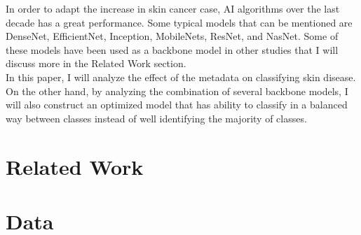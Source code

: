 In order to adapt the increase in skin cancer case, AI algorithms over the last decade has a great performance. Some typical models that can be mentioned are DenseNet\cite{06993}, EfficientNet\cite{04861}, Inception\cite{00567}, MobileNets\cite{04861}\cite{04381}\cite{02244}, ResNet\cite{03385}\cite{05027}, and NasNet\cite{07012}. Some of these models have been used as a backbone model in other studies that I will discuss more in the Related Work section. \\
In this paper, I will analyze the effect of the metadata on classifying skin disease. On the other hand, by analyzing the combination of several backbone models, I will also construct an optimized model that has ability to classify in a balanced way between classes instead of well identifying the majority of classes. 

\section{Related Work} 

\section{Data}

